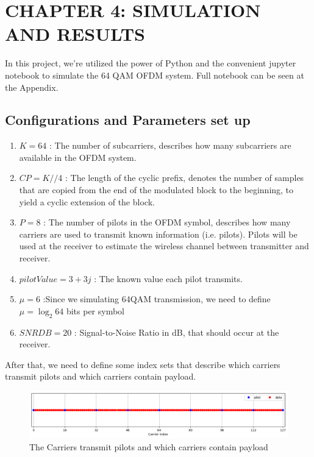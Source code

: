 \section*{CHAPTER 4: SIMULATION AND RESULTS}
\setcounter{section}{4}
\setcounter{subsection}{0}
\setcounter{figure}{0}
\setcounter{table}{0}

In this project, we're utilized the power of Python and the convenient jupyter notebook to simulate the 64 QAM OFDM system. Full notebook can be seen at the Appendix.

\subsection{Configurations and Parameters set up}

\begin{enumerate}
    \item $K = 64$ : The number of subcarriers, describes how many subcarriers are available in the OFDM system.
    \item $CP = K//$4 : The length of the cyclic prefix, denotes the number of samples that are copied from the end of the modulated block to the beginning, to yield a cyclic extension of the block.
    \item $P = 8$ : The number of pilots in the OFDM symbol, describes how many carriers are used to transmit known information (i.e. pilots). Pilots will be used at the receiver to estimate the wireless channel between transmitter and receiver.
    \item $pilotValue = 3+3j$ : The known value each pilot transmits.
    \item $\mu = 6$ :Since we simulating 64QAM transmission, we need to define $\mu = \log_{2} 64$ bits per symbol
    \item $SNRDB = 20$ : Signal-to-Noise Ratio in dB, that should occur at the receiver.
\end{enumerate}

After that, we need to define some index sets that describe which carriers transmit pilots and which carriers contain payload.

\begin{figure}[htbp]
    \centering
    \includegraphics[width=\linewidth]{../Source/results/carrier_index}
    \caption{The Carriers transmit pilots and which carriers contain payload}
    \label{carrier_index}
\end{figure}

